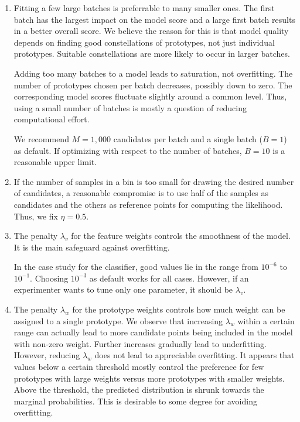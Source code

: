 \begin{enumerate}
\item Fitting a few large batches is preferrable to many smaller ones.
The first batch has the largest impact on the model score and a large first batch results in a better overall score.
We believe the reason for this is that model quality depends on finding good constellations of prototypes, not just individual prototypes.
Suitable constellations are more likely to occur in larger batches.\par
%
Adding too many batches to a model leads to saturation, not overfitting.
The number of prototypes chosen per batch decreases, possibly down to zero.
The corresponding model scores fluctuate slightly around a common level.
Thus, using a small number of batches is mostly a question of reducing computational effort.\par
%
We recommend $M=1,000$ candidates per batch and a single batch ($B=1$) as default.
If optimizing with respect to the number of batches, $B=10$ is a reasonable upper limit.
%
\item If the number of samples in a bin is too small for drawing the desired number of candidates, a reasonable compromise is to use half of the samples as candidates and the others as reference points for computing the likelihood.
Thus, we fix $\eta=0.5$.
%
\item The penalty $\lambda_v$ for the feature weights controls the smoothness of the model.
It is the main safeguard against overfitting.\par
%
In the case study for the classifier, good values lie in the range from $10^{-6}$ to $10^{-1}$.
Choosing $10^{-3}$ as default works for all cases.
However, if an experimenter wants to tune only one parameter, it should be $\lambda_v$.
%
\item The penalty $\lambda_w$ for the prototype weights controls how much weight can be assigned to a single prototype.
We observe that increasing $\lambda_w$ within a certain range can actually lead to more candidate points being included in the model with non-zero weight.
Further increases gradually lead to underfitting.
However, reducing $\lambda_w$ does not lead to appreciable overfitting.
It appears that values below a certain threshold mostly control the preference for few prototypes with large weights versus more prototypes with smaller weights.
Above the threshold, the predicted distribution is shrunk towards the marginal probabilities.
This is desirable to some degree for avoiding overfitting.\par

\end{enumerate}
